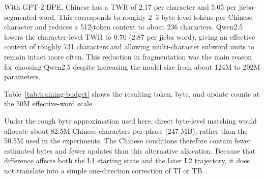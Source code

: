\documentclass[11pt]{article}
\begin{document}
With GPT-2 BPE, Chinese has a TWR of 2.17 per character and 5.05 per jieba-segmented word. This corresponds to roughly 2--3 byte-level tokens per Chinese character and reduces a 512-token context to about 236 characters. Qwen2.5 lowers the character-level TWR to 0.70 (2.87 per jieba word), giving an effective context of roughly 731 characters and allowing multi-character subword units to remain intact more often. This reduction in fragmentation was the main reason for choosing Qwen2.5 despite increasing the model size from about 124M to 202M parameters.

Table~\ref{tab:training-budget} shows the resulting token, byte, and update counts at the 50M effective-word scale.

\begin{table}[H]
\centering
\scriptsize
\setlength{\tabcolsep}{2pt}
\caption{Estimated training budgets per phase. Steps assume effective batch size 65,536 tokens/step. UTF-8 byte estimates use $\sim$5 bytes/word (EN, NL) and $\sim$3 bytes/character (ZH).}
\label{tab:training-budget}
\end{table}

Under the rough byte approximation used here, direct byte-level matching would allocate about 82.5M Chinese characters per phase (247 MB), rather than the 50.5M used in the experiments. The Chinese conditions therefore contain fewer estimated bytes and fewer updates than this alternative allocation. Because that difference affects both the L1 starting state and the later L2 trajectory, it does not translate into a simple one-direction correction of TI or TB.
\end{document}
